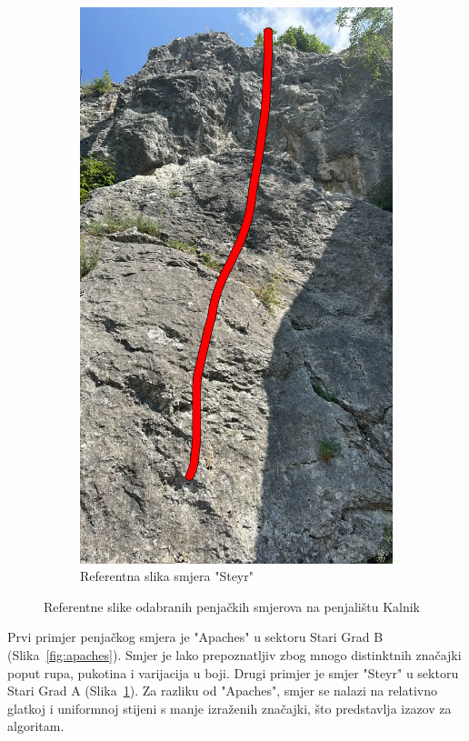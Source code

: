 \begin{figure}[H]
\begin{subfigure}[b]{0.45\textwidth}
        \includegraphics[width=\textwidth]{images/testiranje/steyr_ref.png}
        \caption{Referentna slika smjera "Steyr"}
        \label{fig:steyr}
    \end{subfigure}
    \caption{Referentne slike odabranih penjačkih smjerova na penjalištu Kalnik}
    \label{fig:referentne_slike}
\end{figure}

Prvi primjer penjačkog smjera je "Apaches" u sektoru Stari Grad B (Slika~\ref{fig:apaches}). Smjer je lako prepoznatljiv zbog mnogo distinktnih značajki poput rupa, pukotina i varijacija u boji. Drugi primjer je smjer "Steyr" u sektoru Stari Grad A (Slika~\ref{fig:steyr}). Za razliku od "Apaches", smjer se nalazi na relativno glatkoj i uniformnoj stijeni s manje izraženih značajki, što predstavlja izazov za algoritam.

